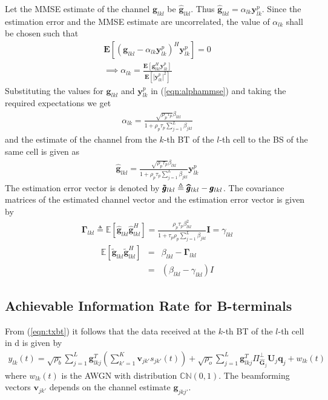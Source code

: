 \documentclass[10pt, a4paper, twoside,fleqn]{article}
\begin{document}
Let the MMSE estimate of the channel $\pmb{g}_{lkl}$ be $\pmb{\hat g}_{lkl}$. Thus $\pmb{\hat g}_{lkl} = \alpha_{lk}\pmb{y}_{lk}^{p}$. Since the estimation error and the MMSE estimate are uncorrelated, the value of $\alpha_{lk}$ shall be chosen such that
\begin{eqnarray}\label{eqn:alphammse}
	\pmb{E}[(\pmb{g}_{lkl}-\alpha_{lk}\pmb{y}_{lk}^{p})^H \pmb{y}_{lk}^{p}] = 0 \nonumber \\
	\implies \alpha_{lk} = \frac{\pmb{E}[\pmb{g}^{H}_{lkl} \pmb{y}_{lk}^{p}]}{\pmb{E}[|\pmb{y}_{lk}^{p}|^2]}
\end{eqnarray}
Substituting the values for $\pmb{g}_{lkl}$ and $\pmb{y}_{lk}^{p}$ in (\ref{eqn:alphammse}) and taking the required expectations we get
\begin{eqnarray}\label{eq:alphapll}
	\alpha_{lk}=\frac{\sqrt{\rho_p \tau_p} \beta_{lkl}}{1+\rho_p\tau_p\sum\limits_{j=1}^{L}\beta_{jkl}}
\end{eqnarray}
and the estimate of the channel from the $k$-th BT of the $l$-th cell to the BS of the same cell is given as
\begin{eqnarray}\label{eq:estimatehpll}
	\pmb{\hat g}_{lkl} = \frac{\sqrt{\rho_p\tau_p}\beta_{lkl}}{1+\rho_p\tau_p\sum\limits_{j=1}^{L}\beta_{jkl}} \pmb{y}_{lk}^{p}
\end{eqnarray}
The estimation error vector is denoted by ${\pmb{\Tilde g}_{lkl}}  \triangleq  \pmb{{\widehat g}}_{lkl} - \pmb{g}_{lkl}$.
The covariance matrices of the estimated channel vector and the estimation error vector is given by
\begin{eqnarray}
	\pmb{\Gamma}_{lkl} \triangleq \mathbb{E}[\pmb{\hat g}_{lkl}\pmb{\hat g}^H_{lkl}]
                    =       \frac{\rho_p\tau_p\beta^2_{lkl}}{1+\tau_p\rho_p\sum\limits_{j=1}^{L}\beta_{jkl}}\pmb{I} = \gamma_{lkl}
\end{eqnarray}
\begin{eqnarray}
    \mathbb{E}[\pmb{\widetilde{g}}_{lkl} \pmb{\widetilde{g}}^H_{lkl}] &=& \beta_{lkl}-\pmb{\Gamma}_{lkl} \nonumber \\
          									    &=& (\beta_{lkl} - \gamma_{lkl})I
\end{eqnarray}

\subsection{Achievable Information Rate for B-terminals}
From (\ref{eqn:txbt}) it follows that the data received at the $k$-th BT of the $l$-th cell in d is given by
\begin{eqnarray}\label{eq:ot}
 	y_{lk}(t) = \sqrt{\rho_b}\sum_{j=1}^{L} \pmb{g}_{lkj}^{T} \left(\sum_{k'=1}^{K}\pmb{v}_{jk'}s_{jk'}(t)\right)
 		      + \sqrt{\rho_o}\sum_{j=1}^{L}\pmb{g}^T_{lkj} \Pi^{\perp}_{{\pmb{\hat{G}}_j}} \pmb{U}_j\pmb{q}_{j}+ w_{lk}(t)
\end{eqnarray} 
where $w_{lk}(t)$ is the AWGN with distribution ${\mathbb C}{\mathbb N}(0,1)$. The beamforming vectors $\pmb{v}_{jk'}$ depends on the channel estimate $\pmb{g}_{jkj'}$.
\end{document}

